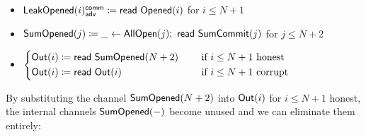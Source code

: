 \begin{itemize}
\item {\color{red} $\mathsf{LeakOpened}(i)^{\mathsf{comm}}_{\mathsf{adv}} \coloneqq \mathsf{read} \ \mathsf{Opened}(i)$ for $i \leq N+1$}
\item {\color{red} $\mathsf{SumOpened}(j) \coloneqq \_ \leftarrow \mathsf{AllOpen}(j); \ \mathsf{read} \ \mathsf{SumCommit}(j)$ for $j \leq N+2$}
\item $\begin{cases*} \Out(i) \coloneqq \read{\SumOpened(N+2)} & \hspace{10pt} \text{if $i \leq N+1$ honest} \\ \Out(i) \coloneqq \read{\Out(i)} & \hspace{10pt} \text{if $i \leq N+1$ corrupt} \end{cases*}$
\end{itemize}

\noindent By substituting the channel $\mathsf{SumOpened}(N+2)$ into $\mathsf{Out}(i)$ for $i \leq N+1$ honest, the internal channels $\mathsf{SumOpened}(-)$ become unused and we can eliminate them entirely:


